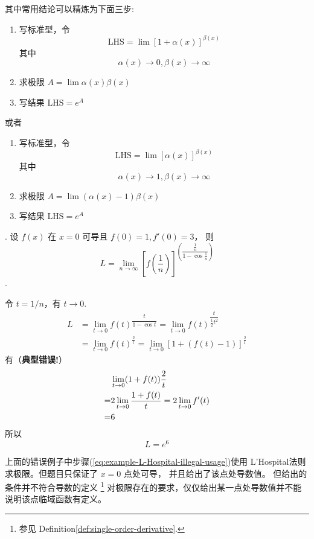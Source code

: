 其中常用结论可以精炼为下面三步:
\begin{enumerate}
	\item 写标准型，令
	\[\mbox{LHS} = \lim{} \left[ 1+\alpha(x)\right] ^{\beta(x)}\]
	其中 \[\alpha(x)\to0, \beta(x)\to\infty\]
	\item 求极限 $A = \lim \alpha(x)\beta(x)$
	\item 写结果 $\mbox{LHS} = e^{A}$
\end{enumerate}

或者
\begin{enumerate}
	\item 写标准型，令
	\[\mbox{LHS} = \lim{} \left[ \alpha(x)\right] ^{\beta(x)}\]
	其中 \[\alpha(x)\to 1, \beta(x)\to\infty\]
	\item 求极限 $A = \lim (\alpha(x) - 1)\beta(x)$
	\item 写结果 $\mbox{LHS} = e^{A}$
\end{enumerate}

\begin{example}
    \label{counter-example-of-usage-of-L-Hospital}
    \cite[question 30]{w660}.
    设 $f(x)$ 在 $x = 0$ 可导且 $f(0) = 1, f'(0) = 3$，
    则
    \[
        L = \lim_{n \to \infty} {\left[
            f \left(\dfrac{1}{n}\right) 
        \right]}^{\left(\dfrac{\frac{1}{n}}{1 - \cos \frac{1}{n}} \right)}
    \]
    \cite[question 30]{w660}.

    令 $t = 1/n$，有 $t \to 0$.
    \begin{align*}
        L &= \lim_{t \to 0} {f(t)}^{\dfrac{t}{1 - \cos t}} 
          = \lim_{t \to 0} {f(t)}^{\dfrac{t}{\frac{1}{2} t^2}}\\
          &= \lim_{t \to 0} {f(t)}^{\frac{2}{t}} 
          = \lim_{t \to 0} {[1 + (f(t) - 1)]}^{\frac{2}{t}}
    \end{align*}
    有（\textbf{典型错误!}）
    \begin{align}
        &\lim_{t \to 0} (1+f(t)) \frac{2}{t} \notag \\
        = &2\lim_{t \to 0} \dfrac{1+ f(t)}{t} 
        = 2\lim_{t \to 0} {f'(t)} \label{eq:example-L-Hospital-illegal-usage}  \\
        = &6 \notag
    \end{align}
    所以
    \[
        L = e^{6}
    \]
\end{example}

上面的错误例子中步骤(\ref{eq:example-L-Hospital-illegal-usage})使用
L'Hospital法则求极限。但题目只保证了 $x = 0$ 点处可导，
并且给出了该点处导数值。 但给出的条件并不符合导数的定义
\footnote{参见 Definition\ref{def:single-order-derivative}.}
对极限存在的要求，仅仅给出某一点处导数值并不能说明该点临域函数有定义。


